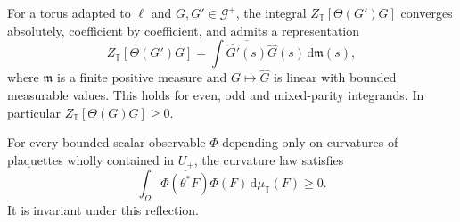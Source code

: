 \documentclass[11pt,letterpaper,reqno]{amsart}
\newcommand{\dd}{\mathrm d}
\begin{document}
\begin{proposition}\label{thm:reg-adapted-positivity}
For a torus adapted to $\ell$ and $G,G'\in\mathcal G^+$, the integral
$Z_{\mathbb T}[\Theta(G')G]$ converges absolutely, coefficient by
coefficient, and admits a representation
\begin{equation}\label{eq:reg-positive-representation}
 Z_{\mathbb T}[\Theta(G')G]
   =\int\overline{\widehat{G'}(s)}\widehat G(s)\,\dd\mathfrak m(s),
\end{equation}
where $\mathfrak m$ is a finite positive measure and
$G\mapsto\widehat G$ is linear with bounded measurable values.
This holds for even, odd and mixed-parity integrands. In particular
$Z_{\mathbb T}[\Theta(G)G]\ge0$.

For every bounded scalar observable $\Phi$ depending only on curvatures
of plaquettes wholly contained in $U_+$, the curvature law satisfies
\begin{equation}\label{eq:reg-law-positivity}
 \int_\Omega\overline{\Phi(\theta^*F)}\Phi(F)\,\dd\mu_{\mathbb T}(F)
 \ge0.
\end{equation}
It is invariant under this reflection.
\end{proposition}
\end{document}
